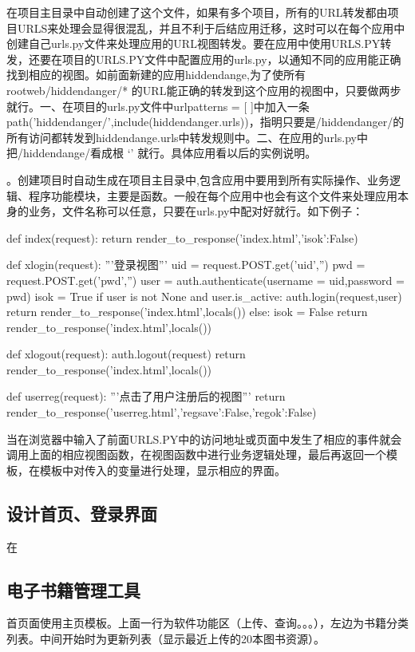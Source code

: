 \documentclass[a4paper]{ctexart}
\begin{document}
             在项目主目录中自动创建了这个文件，如果有多个项目，所有的URL转发都由项目URLS来处理会显得很混乱，并且不利于后结应用迁移，这时可以在每个应用中创建自己urls.py文件来处理应用的URL视图转发。要在应用中使用URLS.PY转发，还要在项目的URLS.PY文件中配置应用的urls.py，以通知不同的应用能正确找到相应的视图。如前面新建的应用hiddendange,为了使所有 rootweb/hiddendanger/* 的URL能正确的转发到这个应用的视图中，只要做两步就行。一、在项目的urls.py文件中urlpatterns = [ ]中加入一条 path('hiddendanger/',include(hiddendanger.urls))，指明只要是/hiddendanger/的所有访问都转发到hiddendange.urls中转发规则中。二、在应用的urls.py中把/hiddendange/看成根 ‘’ 就行。具体应用看以后的实例说明。
                      
                      {\color{red}{三、views.py}}。创建项目时自动生成在项目主目录中,包含应用中要用到所有实际操作、业务逻辑、程序功能模块，主要是函数。一般在每个应用中也会有这个文件来处理应用本身的业务，文件名称可以任意，只要在urls.py中配对好就行。如下例子：                   
 \begin{python}
 def index(request):
     return render_to_response('index.html',{'isok':False})

 def xlogin(request):
    '''登录视图'''    
    uid = request.POST.get('uid','')
    pwd = request.POST.get('pwd','')
    user = auth.authenticate(username = uid,password = pwd)
    isok = True
    if user is not None and user.is_active:
        auth.login(request,user)
        return render_to_response('index.html',locals())
    else:
        isok = False
        return render_to_response('index.html',locals())

 def xlogout(request):
    auth.logout(request)
    return render_to_response('index.html',locals())

 def userreg(request):
    '''点击了用户注册后的视图'''
    return render_to_response('userreg.html',{'regsave':False,'regok':False})
 \end{python}

   当在浏览器中输入了前面URLS.PY中的访问地址或页面中发生了相应的事件就会调用上面的相应视图函数，在视图函数中进行业务逻辑处理，最后再返回一个模板，在模板中对传入的变量进行处理，显示相应的界面。

 \subsection{设计首页、登录界面}
 在
 \subsection{电子书籍管理工具}
 首页面使用主页模板。上面一行为软件功能区（上传、查询。。。），左边为书籍分类列表。中间开始时为更新列表（显示最近上传的20本图书资源）。
\end{document}
